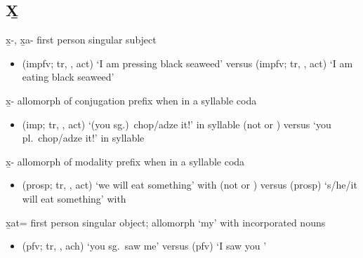\documentclass[12pt,letterpaper,oneside,article]{memoir}
\begin{document}
\subsection{X̱}\label{sec:alphalist-xh}
\begin{morphdesc}[resume*=alphalist]
\item[x̱-, x̱a-]
	first person singular subject
	\begin{itemize}
	\item	{} (impfv; tr, ,  act) ‘I am pressing black seaweed’\newline
		versus  (impfv; tr, ,  act) ‘I am eating black seaweed’
	\end{itemize}

\item[x̱-]
	allomorph of  conjugation prefix when in a syllable coda
	\begin{itemize}
	\item	{} (imp; tr, ,  act) ‘(you sg.)\ chop/adze it!’ in syllable \newline
		(not  or )\newline
		versus  ‘you pl.\ chop/adze it!’ in syllable 
	\end{itemize}

\item[x̱-]
	allomorph of  modality prefix when in a syllable coda
	\begin{itemize}
	\item	{} (prosp; tr, ,  act) ‘we will eat something’ with \newline
		(not  or )\newline
		versus  (prosp) ‘s/he/it will eat something’ with 
	\end{itemize}

\item[x̱at=]
	first person singular object;
	allomorph  ‘my’ with incorporated nouns
	\begin{itemize}
	\item	{} (pfv; tr, , ach) ‘you sg.\ saw me’\newline
		versus  (pfv) ‘I saw you ’
	\end{itemize}
\end{morphdesc}
\end{document}
